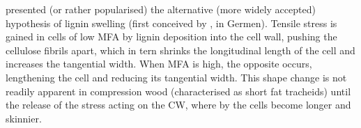 \cite{Boyd_1972} presented (or rather popularised) the alternative (more widely
accepted) hypothesis of lignin swelling (first conceived by \cite{munch1938}, in Germen). Tensile
stress is gained in cells of low MFA by lignin deposition into the cell wall,
pushing the cellulose fibrils apart, which in tern shrinks the longitudinal
length of the cell and increases the tangential width. When MFA is high, the
opposite occurs, lengthening the cell and reducing its tangential width. This
shape change is not readily apparent in compression wood (characterised as short fat
tracheids) until the release of the stress acting on the CW, where by the cells
become longer and skinnier.
